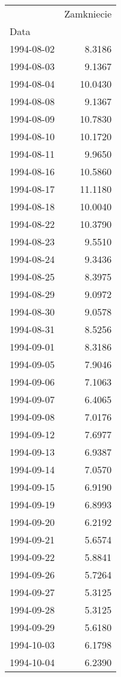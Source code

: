 \begin{tabular}{lr}
\toprule
{} &  Zamkniecie \\
Data       &             \\
\midrule
1994-08-02 &      8.3186 \\
1994-08-03 &      9.1367 \\
1994-08-04 &     10.0430 \\
1994-08-08 &      9.1367 \\
1994-08-09 &     10.7830 \\
1994-08-10 &     10.1720 \\
1994-08-11 &      9.9650 \\
1994-08-16 &     10.5860 \\
1994-08-17 &     11.1180 \\
1994-08-18 &     10.0040 \\
1994-08-22 &     10.3790 \\
1994-08-23 &      9.5510 \\
1994-08-24 &      9.3436 \\
1994-08-25 &      8.3975 \\
1994-08-29 &      9.0972 \\
1994-08-30 &      9.0578 \\
1994-08-31 &      8.5256 \\
1994-09-01 &      8.3186 \\
1994-09-05 &      7.9046 \\
1994-09-06 &      7.1063 \\
1994-09-07 &      6.4065 \\
1994-09-08 &      7.0176 \\
1994-09-12 &      7.6977 \\
1994-09-13 &      6.9387 \\
1994-09-14 &      7.0570 \\
1994-09-15 &      6.9190 \\
1994-09-19 &      6.8993 \\
1994-09-20 &      6.2192 \\
1994-09-21 &      5.6574 \\
1994-09-22 &      5.8841 \\
1994-09-26 &      5.7264 \\
1994-09-27 &      5.3125 \\
1994-09-28 &      5.3125 \\
1994-09-29 &      5.6180 \\
1994-10-03 &      6.1798 \\
1994-10-04 &      6.2390 \\

\end{tabular}
